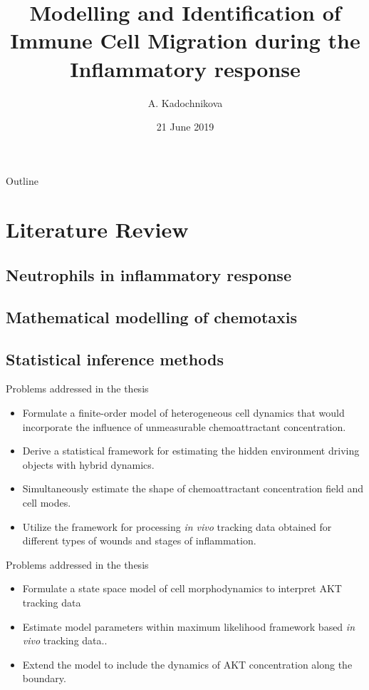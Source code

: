 \documentclass[12pt]{beamer}
\title[Identification of immune cell migration] %
{Modelling and Identification of Immune Cell Migration during the Inflammatory response}
\author[A. Kadochnikova]{A. Kadochnikova\inst{1}}
\institute[ACSE,TUoS]{\inst{1}
  Department of Automatic Control and Systems Engineering\\
  The University of Sheffield}
\date[21/06/2019]{21 June 2019}
\begin{document}
\begin{frame}
  \titlepage
\end{frame}
\begin{frame}{Outline}
  \tableofcontents[hideallsubsections]
\end{frame}


\section{Literature Review}
\subsection{Neutrophils in inflammatory response}

\subsection{Mathematical modelling of chemotaxis}

\subsection{Statistical inference methods}
\begin{frame}{Problems addressed in the thesis}
\begin{itemize}
	\item Formulate a finite-order model of heterogeneous cell dynamics that would incorporate the influence of unmeasurable chemoattractant concentration.
	\item Derive a statistical framework for estimating the hidden environment driving objects with hybrid dynamics.
	\item Simultaneously estimate the shape of chemoattractant concentration field and cell modes.
	\item Utilize the framework for processing \textit{in vivo} tracking data obtained for different types of wounds and stages of inflammation.
\end{itemize}
\end{frame}

\begin{frame}{Problems addressed in the thesis}
\begin{itemize}
	\item Formulate a state space model of cell morphodynamics to interpret AKT tracking data
	\item Estimate model parameters within maximum likelihood framework based \textit{in vivo} tracking data..
	\item Extend the model to include the dynamics of AKT concentration along the boundary.
\end{itemize}
\end{frame}
\end{document}

